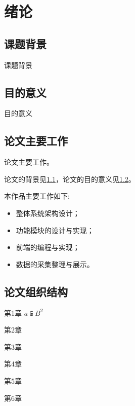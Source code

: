 
\clearpage
\setcounter{page}{1} 

\chapter{绪论}

\section{课题背景}\label{sec:background}
课题背景

\section{目的意义}\label{sec:meaningful}
目的意义

\section{论文主要工作}
论文主要工作。

论文的背景见\ref{sec:background}，论文的目的意义见\ref{sec:meaningful}。

本作品主要工作如下:
\begin{itemize}
	\item 整体系统架构设计；
	\item 功能模块的设计与实现；
	\item 前端的编程与实现；
	\item 数据的采集整理与展示。
\end{itemize}

\section{论文组织结构}

第1章
$a \subsetneqq B^2 $

第2章
 
第3章

第4章

第5章

第6章